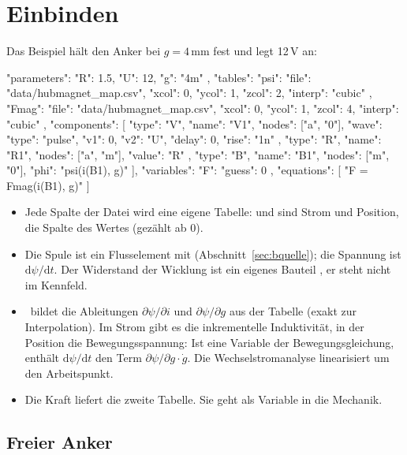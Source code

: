 \section{Einbinden}
\label{sec:kennfeld-einbinden}

Das Beispiel  hält den Anker bei
$g=4$\,mm fest und legt 12\,V an:

\begin{json}
"parameters": { "R": 1.5, "U": 12, "g": "4m" },
"tables": {
  "psi":  { "file": "data/hubmagnet_map.csv", "xcol": 0, "ycol": 1, "zcol": 2, "interp": "cubic" },
  "Fmag": { "file": "data/hubmagnet_map.csv", "xcol": 0, "ycol": 1, "zcol": 4, "interp": "cubic" }
},
"components": [
  { "type": "V", "name": "V1", "nodes": ["a", "0"],
    "wave": { "type": "pulse", "v1": 0, "v2": "U", "delay": 0, "rise": "1n" } },
  { "type": "R", "name": "R1", "nodes": ["a", "m"], "value": "R" },
  { "type": "B", "name": "B1", "nodes": ["m", "0"], "phi": "psi(i(B1), g)" }
],
"variables": { "F": { "guess": 0 } },
"equations": [ "F = Fmag(i(B1), g)" ]
\end{json}

\begin{itemize}
  \item Jede Spalte der Datei wird eine eigene Tabelle:  und 
    sind Strom und Position,  die Spalte des Wertes (gezählt ab 0).
  \item Die Spule ist ein Flusselement  mit
     (Abschnitt~\ref{sec:bquelle}); die Spannung ist
    $\mathrm{d}\psi/\mathrm{d}t$. Der Widerstand der Wicklung ist ein eigenes
    Bauteil , er steht nicht im Kennfeld.
  \item \esim\ bildet die Ableitungen $\partial\psi/\partial i$ und
    $\partial\psi/\partial g$ aus der Tabelle (exakt zur Interpolation). Im
    Strom gibt es die inkrementelle Induktivität, in der Position die
    Bewegungsspannung: Ist  eine Variable der Bewegungsgleichung, enthält
    $\mathrm{d}\psi/\mathrm{d}t$ den Term $\partial\psi/\partial g\cdot\dot g$.
    Die Wechselstromanalyse linearisiert um den Arbeitspunkt.
  \item Die Kraft liefert die zweite Tabelle. Sie geht als Variable in die
    Mechanik.
\end{itemize}

\subsection*{Freier Anker}

